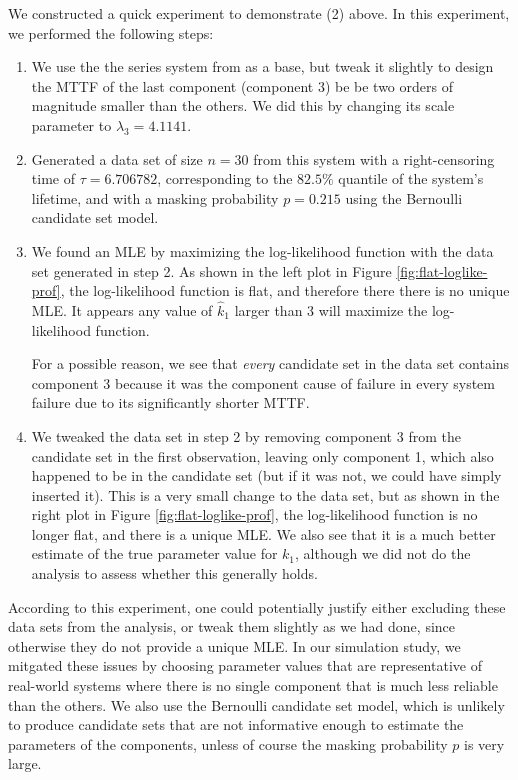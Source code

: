 \documentclass[
]{article}
\begin{document}
We constructed a quick experiment to demonstrate (2) above. In this
experiment, we performed the following steps:

\begin{enumerate}
\def\labelenumi{\arabic{enumi}.}
\item
  We use the the series system from \citep{Huairu-2013} as a base, but
  tweak it slightly to design the MTTF of the last component (component
  3) be be two orders of magnitude smaller than the others. We did this
  by changing its scale parameter to \(\lambda_3 = 4.1141\).
\item
  Generated a data set of size \(n = 30\) from this system with a
  right-censoring time of \(\tau = 6.706782\), corresponding to the
  \(82.5\%\) quantile of the system's lifetime, and with a masking
  probability \(p = 0.215\) using the Bernoulli candidate set model.
\item
  We found an MLE by maximizing the log-likelihood function with the
  data set generated in step 2. As shown in the left plot in Figure
  \ref{fig:flat-loglike-prof}, the log-likelihood function is flat, and
  therefore there there is no unique MLE. It appears any value of
  \(\hat k_1\) larger than \(3\) will maximize the log-likelihood
  function.

  For a possible reason, we see that \emph{every} candidate set in the
  data set contains component 3 because it was the component cause of
  failure in every system failure due to its significantly shorter MTTF.
\item
  We tweaked the data set in step 2 by removing component 3 from the
  candidate set in the first observation, leaving only component 1,
  which also happened to be in the candidate set (but if it was not, we
  could have simply inserted it). This is a very small change to the
  data set, but as shown in the right plot in Figure
  \ref{fig:flat-loglike-prof}, the log-likelihood function is no longer
  flat, and there is a unique MLE. We also see that it is a much better
  estimate of the true parameter value for \(k_1\), although we did not
  do the analysis to assess whether this generally holds.
\end{enumerate}

According to this experiment, one could potentially justify either
excluding these data sets from the analysis, or tweak them slightly as
we had done, since otherwise they do not provide a unique MLE. In our
simulation study, we mitgated these issues by choosing parameter values
that are representative of real-world systems where there is no single
component that is much less reliable than the others. We also use the
Bernoulli candidate set model, which is unlikely to produce candidate
sets that are not informative enough to estimate the parameters of the
components, unless of course the masking probability \(p\) is very
large.
\end{document}
